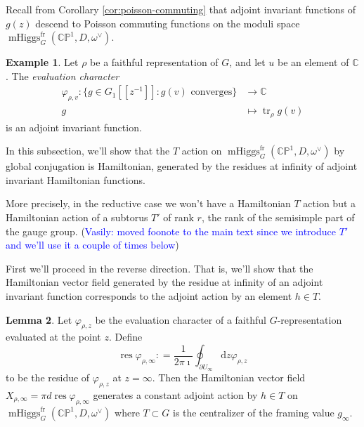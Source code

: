 \documentclass[11pt, oneside, reqno]{amsart}
\theoremstyle{definition} \newtheorem{definition}{Definition}[section]
\newtheorem{lemma}[definition]{Lemma}
\theoremstyle{definition} \newtheorem{remark}[definition]{Remark}
\theoremstyle{definition} \newtheorem{remarks}[definition]{Remarks}
\theoremstyle{definition} \newtheorem{question}[definition]{Question}
\theoremstyle{definition} \newtheorem*{note}{Note}
\theoremstyle{definition} \newtheorem{example}[definition]{Example}
\theoremstyle{definition} \newtheorem{examples}[definition]{Examples}
\newcommand{\bb}[1]{\mathbb{#1}}
\newcommand{\CC}{\mathbb{C}}
\DeclareMathOperator{\tr}{tr}
\DeclareMathOperator{\res}{res}
\DeclareMathOperator{\mhiggs}{mHiggs}
\renewcommand{\d}{\mathrm{d}}
\newcommand{\fr}{\mathrm{fr}}
\newcommand{\vasily}[1]{(\textcolor{blue}{Vasily: #1})}
\begin{document}
Recall from Corollary \ref{cor:poisson-commuting} that adjoint invariant functions of $g(z)$ descend to Poisson commuting functions on the moduli space $\mhiggs^\fr_G(\bb{CP}^1, D, \omega^\vee)$.
 
\begin{example}
Let $\rho$ be a faithful representation of $G$, and let $u$ be an element of $\CC$. The \emph{evaluation character}  
\begin{align*}
\varphi_{\rho,v} \colon \{g \in G_1[[z^{-1}]] \colon g(v) \text{ converges}\} &\to \mathbb{C}\\
g &\mapsto  \tr_{\rho} g(v)
\end{align*}
is an adjoint invariant function. 
\end{example}

In this subsection, we'll show that the $T$ action on $\mhiggs^\fr_G(\bb{CP}^1, D, \omega^\vee)$ by global conjugation is Hamiltonian, generated by the residues at infinity of adjoint invariant Hamiltonian functions.

More precisely, in the reductive case we won't have a Hamiltonian $T$ action but a Hamiltonian action of a subtorus $T'$ of rank $r$, the rank of the semisimple part of the gauge group.
\vasily{moved foonote to the main text since we introduce $T'$ and we'll use
  it a couple of times below} 

First we'll proceed in the reverse direction.  That is, we'll show that the Hamiltonian vector field generated by the residue at infinity of an adjoint invariant function corresponds to the adjoint action by an element $h \in T$. 
 \begin{lemma} 
 Let $\varphi_{\rho, z}$ be the evaluation character of a faithful $G$-representation evaluated at the point $z$. Define
   \begin{equation}
    \res  \varphi_{\rho, \infty} : = \frac{1}{2 \pi \imath} \oint_{\partial U_{\infty}}  \d z \varphi_{\rho, z} 
   \end{equation}
   to be the residue of $\varphi_{\rho, z}$ at $z=\infty$.   Then the Hamiltonian vector field  $X_{\rho, \infty} = \pi d \res \varphi_{\rho, \infty}$ generates a constant adjoint action by $h \in T$ on $\mhiggs^\fr_G(\bb{CP}^1, D, \omega^\vee)$
   where $T \subset G$ is the centralizer of the framing value $g_\infty$. 
 \end{lemma}
 
\end{document}
